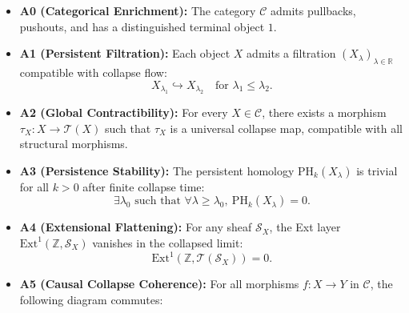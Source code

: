 \documentclass[11pt]{article}
\begin{document}
\begin{itemize}
    \item \textbf{A0 (Categorical Enrichment):} The category $\mathcal{C}$ admits pullbacks, pushouts, and has a distinguished terminal object $1$.

    \item \textbf{A1 (Persistent Filtration):} Each object $X$ admits a filtration $(X_\lambda)_{\lambda \in \mathbb{R}}$ compatible with collapse flow:
    \[
    X_{\lambda_1} \hookrightarrow X_{\lambda_2} \quad \text{for } \lambda_1 \leq \lambda_2.
    \]

    \item \textbf{A2 (Global Contractibility):} For every $X \in \mathcal{C}$, there exists a morphism $\tau_X : X \rightarrow \mathcal{T}(X)$  
    such that $\tau_X$ is a universal collapse map, compatible with all structural morphisms.

    \item \textbf{A3 (Persistence Stability):} The persistent homology $\mathrm{PH}_k(X_\lambda)$ is trivial for all $k > 0$ after finite collapse time:
    \[
    \exists \lambda_0 \text{ such that } \forall \lambda \geq \lambda_0,\ \mathrm{PH}_k(X_\lambda) = 0.
    \]

    \item \textbf{A4 (Extensional Flattening):} For any sheaf $\mathcal{S}_X$, the Ext layer $\mathrm{Ext}^1(\mathbb{Z}, \mathcal{S}_X)$  
    vanishes in the collapsed limit:
    \[
    \mathrm{Ext}^1(\mathbb{Z}, \mathcal{T}(\mathcal{S}_X)) = 0.
    \]

    \item \textbf{A5 (Causal Collapse Coherence):} For all morphisms $f: X \rightarrow Y$ in $\mathcal{C}$, the following diagram commutes:
\begin{center}
\end{center}



\end{itemize}
\end{document}
